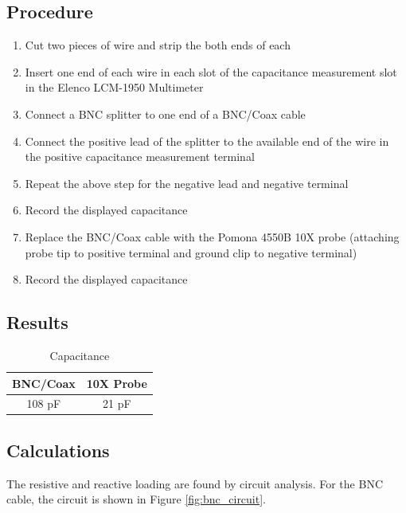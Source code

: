 \documentclass[12pt,letterpaper]{report}
\begin{document}
\subsection*{Procedure}
\begin{enumerate}
	\item Cut two pieces of wire and strip the both ends of each
	\item Insert one end of each wire in each slot of the capacitance measurement slot in the Elenco LCM-1950 Multimeter
	\item Connect a BNC splitter to one end of a BNC/Coax cable
	\item Connect the positive lead of the splitter to the available end of the wire in the positive capacitance measurement terminal
	\item Repeat the above step for the negative lead and negative terminal
	\item Record the displayed capacitance
	\item Replace the BNC/Coax cable with the Pomona 4550B 10X probe (attaching probe tip to positive terminal and ground clip to negative terminal)
	\item Record the displayed capacitance
\end{enumerate}
\subsection*{Results}
\begin{center}
\begin{table}[ht]
\caption{Capacitance}
\centering
	\begin{tabular}{| c | c |}
	\hline
	
	\textbf{BNC/Coax} & \textbf{10X Probe} \\
	\hline
	108 pF & 21 pF \\

	\hline
	\end{tabular}
\end{table}
\end{center}

\subsection*{Calculations}
The resistive and reactive loading are found by circuit analysis. For the BNC cable, the circuit is shown in Figure \ref{fig:bnc_circuit}.
\end{document}
